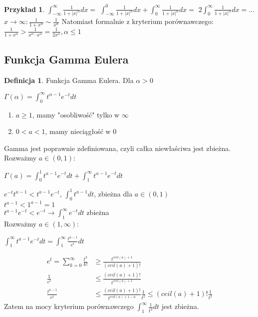 \documentclass{article}
\theoremstyle{definition}
\newtheorem{de}{Definicja}[subsection]
\theoremstyle{definition}
\theoremstyle{definition}
\newtheorem{pk}{Przykład}[subsection]
\theoremstyle{definition}
\begin{document}
\begin{pk}
    $\int_{-\infty}^{\infty} \frac{1}{1+|x|^{\alpha}} dx=$
    $\int_{-\infty}^{0} \frac{1}{1+|x|^{\alpha}} dx + \int_{0}^{\infty} \frac{1}{1+|x|^{\alpha}} dx=$
    $2\int_{0}^{\infty} \frac{1}{1+|x|^{\alpha}} dx=...$\\
    $x\rightarrow \infty: \frac{1}{1+x^{\alpha}} \sim \frac{1}{x^{\alpha}}$ 
    Natomiast formalnie z kryterium porównawczego:
    $\frac{1}{1+x^\alpha} > \frac{1}{x^\alpha \cdot x^\alpha} = \frac{1}{2x^\alpha}, \alpha \leq 1$
\end{pk}

\subsection{Funkcja Gamma Eulera}

\begin{de}
    Funkcja Gamma Eulera. Dla $\alpha>0$\\
    \begin{center}
        $\Gamma(\alpha) = \int_{0}^{\infty} t^{\alpha-1} e^{-t} dt$
    \end{center}
    \begin{enumerate}
        \item $a\geq 1$, mamy "osobliwość" tylko w $\infty$
        \item $0<a<1$, mamy nieciągłość w $0$ 
    \end{enumerate}
    Gamma jest poprawnie zdefiniowana, czyli całka niewłaściwa jest zbieżna.\\
    Rozważmy $a\in(0,1)$:
    \begin{center}
        $\Gamma(a)=\int_{0}^{1} t^{a-1} e^{-t} dt + \int_{1}^{\infty} t^{a-1} e^{-t} dt$
    \end{center}
    $e^{-t}t^{a-1} < t^{a-1}e^{-t}$, $\int_{0}^{1} t^{a-1} dt$, zbieżna dla $a\in(0,1)$\\
    $t^{a-1}<1^{a-1}=1$\\
    $t^{a-1}e^{-t} < e^{-t}\rightarrow \int_{1}^{\infty} e^{-t} dt$ zbieżna\\
    Rozważmy $a\in(1,\infty)$:
    \begin{center}
        $\int_{1}^{\infty} t^{a-1}e^{-t} dt = \int_{1}^{\infty} \frac{t^{a-1}}{e^t} dt$\\
    \end{center}
    \begin{align}
        e^t=\sum_{k=0}^{\infty} \frac{t^k}{k!} &\geq \frac{t^{ceil(a)+1}}{(ceil(a)+1)!}\\
        \frac{1}{e^t} &\leq \frac{(ceil(a)+1)!}{t^{ceil(a)+1}}\\
        \frac{t^{a-1}}{e^t} &\leq \frac{(ceil(a)+1)!}{t^{ceil(a)+1-a}}\frac{1}{t^2}\leq(ceil(a)+1)!\frac{1}{t^2}
    \end{align}
    Zatem na mocy kryterium porównawczego $\int_{1}^{\infty} \frac{1}{t^2} dt$ jest zbieżna.
\end{de}
\end{document}
